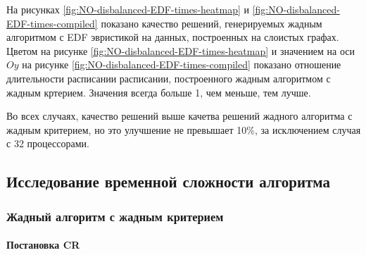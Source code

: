 На рисунках \ref{fig:NO-disbalanced-EDF-times-heatmap} и \ref{fig:NO-disbalanced-EDF-times-compiled} показано качество решений, генерируемых жадным алгоритмом с EDF эвристикой на данных, построенных на слоистых графах. Цветом на рисунке \ref{fig:NO-disbalanced-EDF-times-heatmap} и значением на оси $Oy$ на рисунке \ref{fig:NO-disbalanced-EDF-times-compiled} показано отношение длительности расписании расписании, построенного жадным алгоритмом с жадным кртерием. Значения всегда больше 1, чем меньше, тем лучше.

Во всех случаях, качество решений выше качетва решений жадного алгоритма с жадным критерием, но это улучшение не превышает 10\%, за исключением случая с 32 процессорами.

\subsection{Исследование временной сложности алгоритма}

\subsubsection{Жадный алгоритм с жадным критерием}

\paragraph{Постановка CR}

